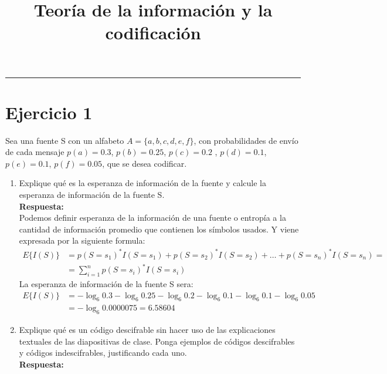 \documentclass[12pt,a4paper]{article}
\newcommand{\horrule}[1]{\rule{\linewidth}{#1}} %
\begin{document}
	
	\title{Teoría de la información y la codificación}
	
	\maketitle
	\horrule{2pt}
	\section{Ejercicio 1}
	Sea una fuente S con un alfabeto $A=\{a, b, c, d, e, f\}$, con probabilidades de envío de cada mensaje $p(a)=0.3$, $p(b)=0.25$, $p(c)=0.2$ , $p(d)=0.1$, $p(e)= 0.1$, $p(f)=0.05$, que se desea codificar.
	\begin{enumerate}
		\item  Explique qué es la esperanza de información de la fuente y calcule la esperanza de información de la fuente S.\\ \textbf{Respuesta:}\\
		Podemos definir esperanza de la información de una fuente o entropía a la cantidad de información promedio que contienen los símbolos usados. Y viene expresada por la siguiente formula:
		$$
		\begin{aligned} E\{I(S)\} &=p\left(S=s_{1}\right)^{*} I\left(S=s_{1}\right)+p\left(S=s_{2}\right)^{*} I\left(S=s_{2}\right)+\ldots+p\left(S=s_{n}\right)^{*} I\left(S=s_{n}\right)=\\ &=\sum_{i=1}^{n} p\left(S=s_{i}\right)^{*} I\left(S=s_{i}\right) \end{aligned}
		$$
		La esperanza de información de la fuente S sera:
		$$ \begin{aligned}E\{I(S)\} &= -\log_{6}{0.3}-\log_{6}{0.25}-\log_{6}{0.2}-\log_{6}{0.1}-\log_{6}{0.1}-\log_{6}{0.05}\\&=-\log_{6}{0.0000075}=6.58604\end{aligned}
$$
	\item  Explique qué es un código descifrable sin hacer uso de las explicaciones textuales de las diapositivas de clase. Ponga ejemplos de códigos descifrables y códigos indescifrables,	justificando cada uno.\\ \textbf{Respuesta:}\\
	

\end{enumerate}
\end{document}

